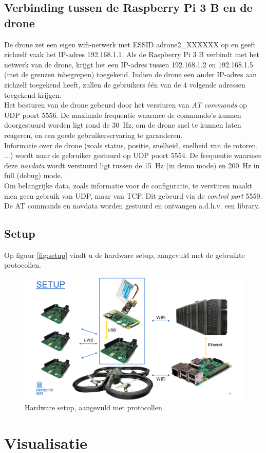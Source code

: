 \subsection{Verbinding tussen de Raspberry Pi 3 B en de drone} \label{sec:raspberry_drone}
De drone zet een eigen wifi-netwerk met ESSID adrone2\_XXXXXX  op en geeft zichzelf vaak het IP-adres 192.168.1.1.
Als de Raspberry Pi 3 B verbindt met het netwerk van de drone, krijgt het een IP-adres tussen 192.168.1.2 en 192.168.1.5 (met de grenzen inbegrepen) toegekend.
Indien de drone een ander IP-adres aan zichzelf toegekend heeft, zullen de gebruikers één van de 4 volgende adressen toegekend krijgen.\\
Het besturen van de drone gebeurd door het versturen van \textit{AT commands} op UDP poort 5556.
De maximale frequentie waarmee de commando's kunnen doorgestuurd worden ligt rond de \SI{30}{\Hz}, om de drone snel te kunnen laten reageren, en een goede gebruikerservaring te garanderen.\\

Informatie over de drone (zoals status, positie, snelheid, snelheid van de rotoren, ...) wordt naar de gebruiker gestuurd op UDP poort 5554.
De frequentie waarmee deze \textit{navdata} wordt verstuurd ligt tussen de \SI{15}{\Hz} (in demo mode) en \SI{200}{\Hz} in full (debug) mode.\\
Om belangrijke data, zoals informatie voor de configuratie, te versturen maakt men geen gebruik van UDP, maar van TCP.
Dit gebeurd via de \textit{control port} 5559. \cite{developer_guide2012}\\
De AT commands en navdata worden gestuurd en ontvangen a.d.h.v. een library.

\subsection{Setup} \label{sec:setup}
Op figuur \ref{fig:setup} vindt u de hardware setup, aangevuld met de gebruikte protocollen.
\begin{figure}[p]
	\centering
	\includegraphics[width=\textwidth]{Setup}
	\caption[Setup]{Hardware setup, aangevuld met protocollen.}
	\label{fig:setup_software}
\end{figure}

\section{Visualisatie} \label{sec:visualization}

